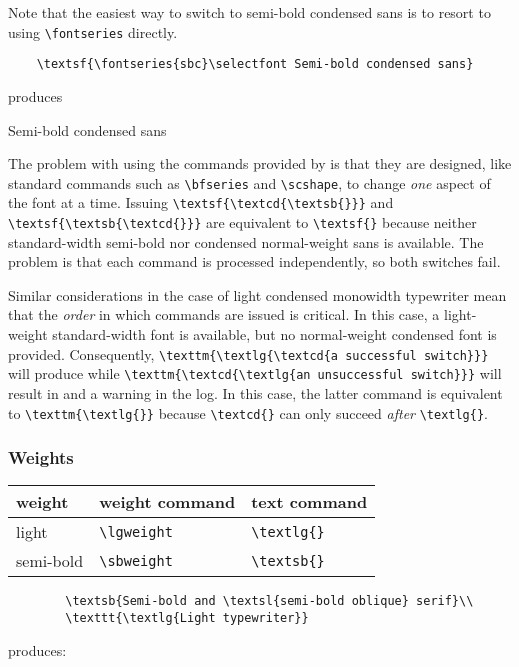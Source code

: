 \documentclass[11pt,british]{article}
\begin{document}
Note that the easiest way to switch to semi-bold condensed sans is to resort to using \verb|\fontseries| directly.
\begin{verbatim}
	\textsf{\fontseries{sbc}\selectfont Semi-bold condensed sans}
\end{verbatim}
produces
\begin{center}
	\textsf{\selectfont Semi-bold condensed sans}
\end{center}
The problem with using the commands provided by  is that they are designed, like standard commands such as \verb|\bfseries| and \verb|\scshape|, to change \emph{one} aspect of the font at a time. Issuing \verb|\textsf{\textcd{\textsb{}}}| and \verb|\textsf{\textsb{\textcd{}}}| are equivalent to \verb|\textsf{}| because neither standard-width semi-bold nor condensed normal-weight sans is available. The problem is that each command is processed independently, so both switches fail.

Similar considerations in the case of light condensed monowidth typewriter mean that the \emph{order} in which commands are issued is critical. In this case, a light-weight standard-width font is available, but no normal-weight condensed font is provided. Consequently, \verb|\texttm{\textlg{\textcd{a successful switch}}}| will produce  while \verb|\texttm{\textcd{\textlg{an unsuccessful switch}}}| will result in  and a warning in the log. In this case, the latter command is equivalent to \verb|\texttm{\textlg{}}| because \verb|\textcd{}| can only succeed \emph{after} \verb|\textlg{}|.

\vfill\pagebreak

\subsubsection{Weights}

	\begin{longtable}{lll}
		\toprule
		\textbf{weight}		&	\textbf{weight command}	&	\textbf{text command}\\\midrule\endhead
		\bottomrule\endfoot
		light							&	\verb|\lgweight|				&	\verb|\textlg{}|\\
		semi-bold					&	\verb|\sbweight|				&	\verb|\textsb{}|\\
	\end{longtable}
		
	\begin{verbatim}
		\textsb{Semi-bold and \textsl{semi-bold oblique} serif}\\
		\texttt{\textlg{Light typewriter}}
	\end{verbatim}
	produces:
	\begin{center}
		\\
		\texttt{}
	\end{center}
\end{document}
